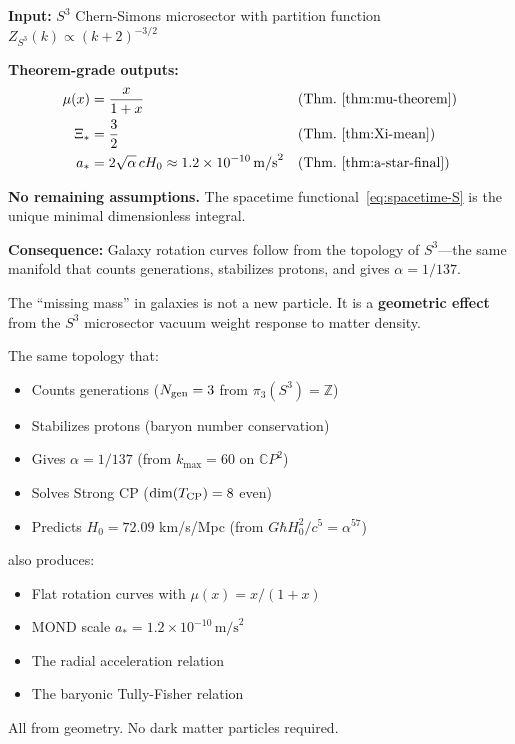 \begin{tcolorbox}[colback=blue!5!white, colframe=blue!60!black, title=MOND Crossover: Complete Derivation Summary, boxsep=3pt, left=3pt, right=3pt]
\small
\textbf{Input:} $S^3$ Chern-Simons microsector with partition function $Z_{S^3}(k) \propto (k+2)^{-3/2}$

\smallskip
\textbf{Theorem-grade outputs:}
\begin{align}
\mu(x) &= \frac{x}{1+x} && \text{(Thm.~\ref{thm:mu-theorem})} \\
\Xi_* &= \frac{3}{2} && \text{(Thm.~\ref{thm:Xi-mean})} \\
a_* &= 2\sqrt{\alpha}\,cH_0 \approx 1.2 \times 10^{-10}\,\mathrm{m/s}^2 && \text{(Thm.~\ref{thm:a-star-final})}
\end{align}

\smallskip
\textbf{No remaining assumptions.} The spacetime functional~\eqref{eq:spacetime-S} is the unique minimal dimensionless integral.

\smallskip
\textbf{Consequence:} Galaxy rotation curves follow from the topology of $S^3$---the same manifold that counts generations, stabilizes protons, and gives $\alpha = 1/137$.
\end{tcolorbox}

\begin{tcolorbox}[colback=green!5!white, colframe=green!60!black, title=The Dark Matter Problem: Resolved]
The ``missing mass'' in galaxies is not a new particle. It is a \textbf{geometric effect} from the $S^3$ microsector vacuum weight response to matter density.

The same topology that:
\begin{itemize}
\item Counts generations ($N_{\rm gen} = 3$ from $\pi_3(S^3) = \mathbb{Z}$)
\item Stabilizes protons (baryon number conservation)
\item Gives $\alpha = 1/137$ (from $k_{\max} = 60$ on $\mathbb{C}P^2$)
\item Solves Strong CP ($\dim(T_{\rm CP}) = 8$ even)
\item Predicts $H_0 = 72.09$ km/s/Mpc (from $G\hbar H_0^2/c^5 = \alpha^{57}$)
\end{itemize}
also produces:
\begin{itemize}
\item Flat rotation curves with $\mu(x) = x/(1+x)$
\item MOND scale $a_* = 1.2 \times 10^{-10}\,\mathrm{m/s}^2$
\item The radial acceleration relation
\item The baryonic Tully-Fisher relation
\end{itemize}
All from geometry. No dark matter particles required.
\end{tcolorbox}

